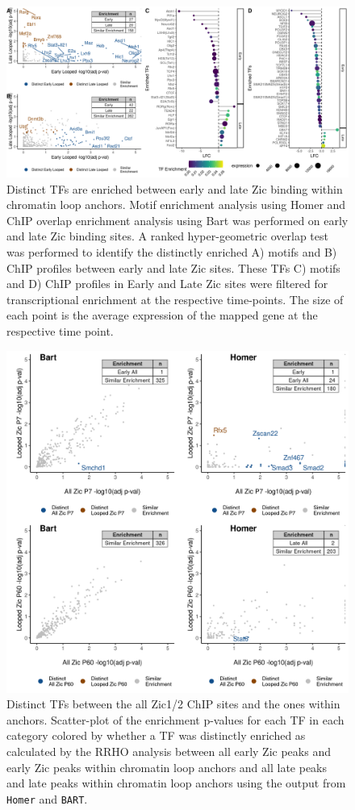 \documentclass[fleqn,10pt]{wlscirep}
\begin{document}
\begin{figure}[!ht]
\centering
\includegraphics[width=.95\textwidth]{../figures/figure2_loop.png}
\caption{ Distinct TFs are enriched between early and late Zic binding within chromatin loop anchors. Motif enrichment analysis using Homer and ChIP overlap enrichment analysis using Bart was performed on early and late Zic binding sites. A ranked hyper-geometric overlap test was performed to identify the distinctly enriched A) motifs and B) ChIP profiles between early and late Zic sites. These TFs C) motifs and D) ChIP profiles in Early and Late Zic sites were filtered for transcriptional enrichment at the respective time-points. The size of each point is the average expression of the mapped gene at the respective time point.}
\label{fig:DistinctTFs_looped}
\end{figure}


\begin{figure}[ht]
\centering
\includegraphics[width=.95\textwidth]{../figures/supp_figure_rrho_allvlooped.png}
\caption{Distinct TFs between the all Zic1/2 ChIP sites and the ones within anchors. Scatter-plot of the enrichment p-values for each TF in each category colored by whether a TF was distinctly enriched as calculated by the RRHO analysis between all early Zic peaks and early Zic peaks within chromatin loop anchors and all late peaks and late peaks within chromatin loop anchors using the output from \texttt{Homer} and \texttt{BART}.  }
\label{fig:loopved_all}
\end{figure}
\end{document}
